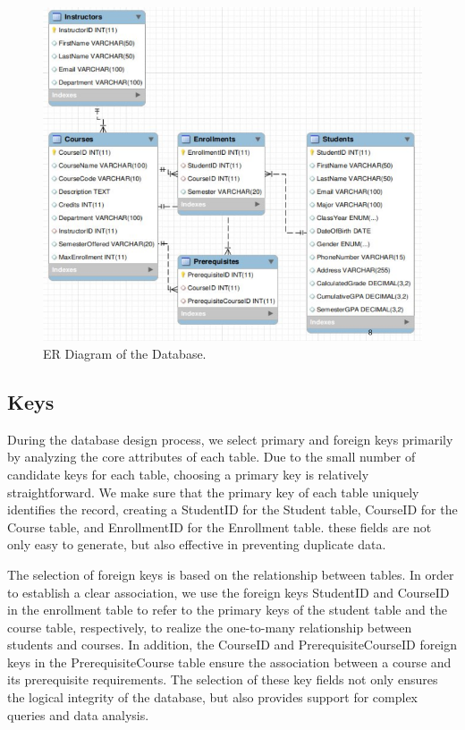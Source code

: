 \documentclass[12pt]{article}
\begin{document}
\begin{figure}[h]
    \centering
    \includegraphics[width=1\textwidth]{images/img4.png}
    \caption{ER Diagram of the Database.}
    \label{fig:mesh1}
\end{figure}


\subsection{Keys}
During the database design process, we select primary and foreign keys primarily by analyzing the core attributes of each table. Due to the small number of candidate keys for each table, choosing a primary key is relatively straightforward. We make sure that the primary key of each table uniquely identifies the record, creating a StudentID for the Student table, CourseID for the Course table, and EnrollmentID for the Enrollment table. these fields are not only easy to generate, but also effective in preventing duplicate data.

The selection of foreign keys is based on the relationship between tables. In order to establish a clear association, we use the foreign keys StudentID and CourseID in the enrollment table to refer to the primary keys of the student table and the course table, respectively, to realize the one-to-many relationship between students and courses. In addition, the CourseID and PrerequisiteCourseID foreign keys in the PrerequisiteCourse table ensure the association between a course and its prerequisite requirements. The selection of these key fields not only ensures the logical integrity of the database, but also provides support for complex queries and data analysis.
\end{document}
